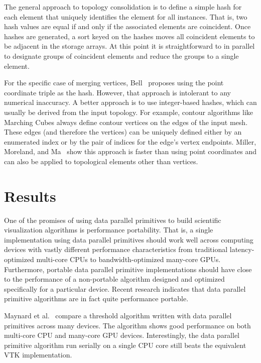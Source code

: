 \documentclass{superfri}
\newcommand*{\scite}[1]{~\cite{#1}}
\newcommand{\etal}{et al.\xspace}
\begin{document}
The general approach to topology consolidation is to define a simple hash
for each element that uniquely identifies the element for all instances.
That is, two hash values are equal if and only if the associated elements
are coincident. Once hashes are generated, a sort keyed on the hashes moves
all coincident elements to be adjacent in the storage arrays. At this point
it is straightforward to in parallel to designate groups of coincident
elements and reduce the groups to a single element.

For the specific case of merging vertices, Bell\scite{Bell2010} proposes
using the point coordinate triple as the hash. However, that approach is
intolerant to any numerical inaccuracy. A better approach is to use
integer-based hashes, which can usually be derived from the input topology.
For example, contour algorithms like Marching Cubes always define contour
vertices on the edges of the input mesh. These edges (and therefore the
vertices) can be uniquely defined either by an enumerated index or by the
pair of indices for the edge's vertex endpoints. Miller, Moreland, and
Ma\scite{Miller2014} show this approach is faster than using point
coordinates and can also be applied to topological elements other than
vertices.


\section{Results}

\noindent
One of the promises of using data parallel primitives to build scientific
visualization algorithms is performance portability. That is, a single
implementation using data parallel primitives should work well across
computing devices with vastly different performance characteristics from
traditional latency-optimized multi-core CPUs to bandwidth-optimized
many-core GPUs. Furthermore, portable data parallel primitive
implementations should have close to the performance of a non-portable
algorithm designed and optimized specifically for a particular device.
Recent research indicates that data parallel primitive algorithms are in
fact quite performance portable.

Maynard \etal\scite{Maynard2013} compare a threshold algorithm written with
data parallel primitives across many devices. The algorithm shows good
performance on both multi-core CPU and many-core GPU devices.
Interestingly, the data parallel primitive algorithm run serially on a
single CPU core still beats the equivalent VTK implementation.
\end{document}
